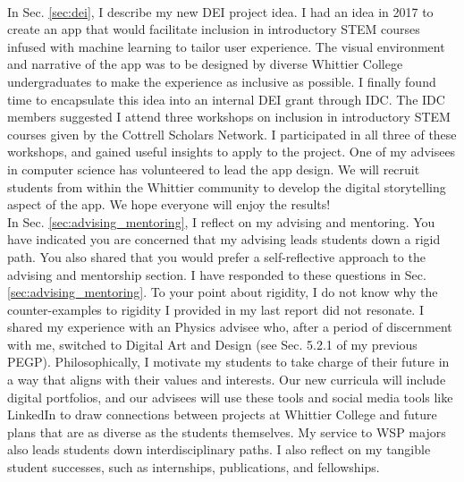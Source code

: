 \documentclass[../../main.tex]{subfiles}
\begin{document}
\\
\vspace{0.15cm}
In Sec. \ref{sec:dei}, I describe my new DEI project idea.  I had an idea in 2017 to create an app that would facilitate inclusion in introductory STEM courses infused with machine learning to tailor user experience.  The visual environment and narrative of the app was to be designed by diverse Whittier College undergraduates to make the experience as inclusive as possible.  I finally found time to encapsulate this idea into an internal DEI grant through IDC.  The IDC members suggested I attend three workshops on inclusion in introductory STEM courses given by the Cottrell Scholars Network.  I participated in all three of these workshops, and gained useful insights to apply to the project.  One of my advisees in computer science has volunteered to lead the app design.  We will recruit students from within the Whittier community to develop the digital storytelling aspect of the app.  We hope everyone will enjoy the results!
\\
\vspace{0.15cm}
In Sec. \ref{sec:advising_mentoring}, I reflect on my advising and mentoring.  You have indicated you are concerned that my advising leads students down a rigid path.  You also shared that you would prefer a self-reflective approach to the advising and mentorship section.  I have responded to these questions in Sec. \ref{sec:advising_mentoring}.  To your point about rigidity, I do not know why the counter-examples to rigidity I provided in my last report did not resonate.  I shared my experience with an Physics advisee who, after a period of discernment with me, switched to Digital Art and Design (see Sec. 5.2.1 of my previous PEGP).  Philosophically, I motivate my students to take charge of their future in a way that aligns with their values and interests.  Our new curricula will include digital portfolios, and our advisees will use these tools and social media tools like LinkedIn to draw connections between projects at Whittier College and future plans that are as diverse as the students themselves.  My service to WSP majors also leads students down interdisciplinary paths.  I also reflect on my tangible student successes, such as internships, publications, and fellowships.
\\
\vspace{0.15cm}
\end{document}
